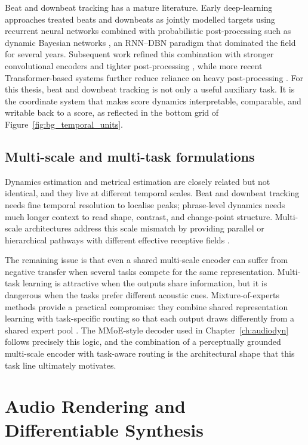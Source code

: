 Beat and downbeat tracking has a mature literature. Early deep-learning approaches treated beats and downbeats as jointly modelled targets using recurrent neural networks combined with probabilistic post-processing such as dynamic Bayesian networks \cite{bock2016joint}, an RNN--DBN paradigm that dominated the field for several years. Subsequent work refined this combination with stronger convolutional encoders and tighter post-processing \cite{bock2020deconstruct,zhao2022beat}, while more recent Transformer-based systems further reduce reliance on heavy post-processing \cite{foscarin2024beat}. For this thesis, beat and downbeat tracking is not only a useful auxiliary task. It is the coordinate system that makes score dynamics interpretable, comparable, and writable back to a score, as reflected in the bottom grid of Figure~\ref{fig:bg_temporal_units}.

\subsection{Multi-scale and multi-task formulations}
\label{sec:bg:scoredyn:joint}

Dynamics estimation and metrical estimation are closely related but not identical, and they live at different temporal scales. Beat and downbeat tracking needs fine temporal resolution to localise peaks; phrase-level dynamics needs much longer context to read shape, contrast, and change-point structure. Multi-scale architectures address this scale mismatch by providing parallel or hierarchical pathways with different effective receptive fields \cite{li2023frame}.

The remaining issue is that even a shared multi-scale encoder can suffer from negative transfer when several tasks compete for the same representation. Multi-task learning is attractive when the outputs share information, but it is dangerous when the tasks prefer different acoustic cues. Mixture-of-experts methods provide a practical compromise: they combine shared representation learning with task-specific routing so that each output draws differently from a shared expert pool \cite{ma2018mmoe}. The MMoE-style decoder used in Chapter~\ref{ch:audiodyn} follows precisely this logic, and the combination of a perceptually grounded multi-scale encoder with task-aware routing is the architectural shape that this task line ultimately motivates.

\section{Audio Rendering and Differentiable Synthesis}
\label{sec:bg:synthesis}

